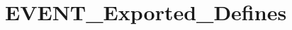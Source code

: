 \hypertarget{group___e_v_e_n_t___exported___defines}{}\section{E\+V\+E\+N\+T\+\_\+\+Exported\+\_\+\+Defines}
\label{group___e_v_e_n_t___exported___defines}
